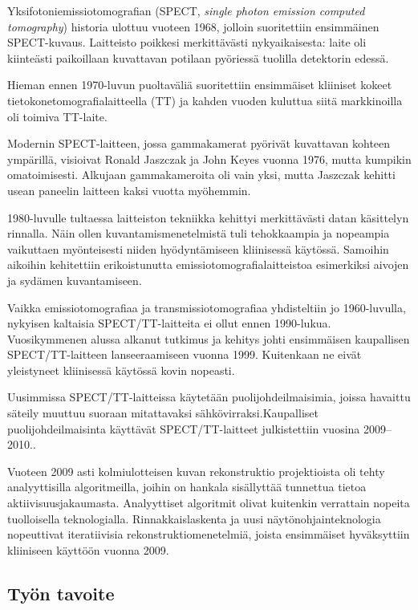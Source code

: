 Yksifotoniemissiotomografian (SPECT, \textit{single photon emission computed tomography}) historia ulottuu vuoteen 1968, jolloin suoritettiin ensimmäinen SPECT-kuvaus. Laitteisto poikkesi merkittävästi nykyaikaisesta: laite oli kiinteästi paikoillaan kuvattavan potilaan pyöriessä tuolilla detektorin edessä.\cite{jaszczak_early_2006, hutton_origins_2014}

Hieman ennen 1970-luvun puoltaväliä suoritettiin ensimmäiset kliiniset kokeet tietokonetomografialaitteella\cite{bercovich_medical_2018} (TT) ja kahden vuoden kuluttua siitä markkinoilla oli toimiva TT-laite\cite{hutton_origins_2014, willemink_evolution_2019}.

Modernin SPECT-laitteen, jossa gammakamerat pyörivät kuvattavan kohteen ympärillä, visioivat Ronald Jaszczak ja John Keyes vuonna 1976, mutta kumpikin omatoimisesti\cite{jaszczak_early_2006}. Alkujaan gammakameroita oli vain yksi, mutta Jaszczak kehitti usean paneelin laitteen kaksi vuotta myöhemmin\cite{jaszczak_early_2006, hutton_origins_2014}.

1980-luvulle tultaessa laitteiston tekniikka kehittyi merkittävästi datan käsittelyn rinnalla. Näin ollen kuvantamismenetelmistä tuli tehokkaampia ja nopeampia vaikuttaen myönteisesti niiden hyödyntämiseen kliinisessä käytössä\cite{jaszczak_early_2006}. Samoihin aikoihin kehitettiin erikoistunutta emissiotomografialaitteistoa esimerkiksi aivojen ja sydämen kuvantamiseen\cite{hutton_origins_2014}.

Vaikka emissiotomografiaa ja transmissiotomografiaa yhdisteltiin jo 1960-luvulla, nykyisen kaltaisia SPECT/TT-laitteita ei ollut ennen 1990-lukua. Vuosikymmenen alussa alkanut tutkimus ja kehitys johti ensimmäisen kaupallisen SPECT/TT-laitteen lanseeraamiseen vuonna 1999. Kuitenkaan ne eivät yleistyneet kliinisessä käytössä kovin nopeasti.\cite{hutton_origins_2014}

Uusimmissa SPECT/TT-laitteissa käytetään puolijohdeilmaisimia, joissa havaittu säteily muuttuu suoraan mitattavaksi sähkövirraksi.Kaupalliset puolijohdeilmaisinta käyttävät SPECT/TT-laitteet julkistettiin vuosina 2009--2010.\cite{hutton_origins_2014}.

Vuoteen 2009 asti kolmiulotteisen kuvan rekonstruktio projektioista oli tehty analyyttisilla algoritmeilla, joihin on hankala sisällyttää tunnettua tietoa aktiivisuusjakaumasta. Analyyttiset algoritmit olivat kuitenkin verrattain nopeita tuolloisella teknologialla. Rinnakkaislaskenta ja uusi näytönohjainteknologia nopeuttivat iteratiivisia rekonstruktiomenetelmiä, joista ensimmäiset hyväksyttiin kliiniseen käyttöön vuonna 2009.\cite{willemink_evolution_2019}

\subsection{Työn tavoite}